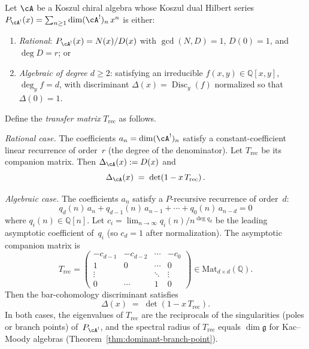 \begin{theorem}\label{thm:discriminant-spectral}
Let $\cA$ be a Koszul chiral algebra whose Koszul dual Hilbert
series $P_{\cA^!}(x) = \sum_{n \geq 1} \dim(\cA^!)_n\, x^n$
is either:
\begin{enumerate}[label=\textup{(\alph*)}]
\item \emph{Rational}: $P_{\cA^!}(x) = N(x)/D(x)$ with
$\gcd(N,D) = 1$, $D(0) = 1$, and $\deg D = r$; or
\item \emph{Algebraic of degree $d \geq 2$}: satisfying an
irreducible $f(x,y) \in \mathbb{Q}[x,y]$, $\deg_y f = d$,
with discriminant $\Delta(x) = \operatorname{Disc}_y(f)$
normalized so that $\Delta(0) = 1$.
\end{enumerate}
Define the \emph{transfer matrix} $T_{\mathrm{rec}}$ as follows.

\emph{Rational case.}
The coefficients $a_n = \dim(\cA^!)_n$ satisfy a
constant-coefficient linear recurrence of order~$r$
(the degree of the denominator).  Let $T_{\mathrm{rec}}$
be its companion matrix.  Then $\Delta_{\cA}(x) := D(x)$ and
\begin{equation}\label{eq:discriminant-spectral-rational}
\Delta_{\cA}(x) \;=\; \det\!\left(1 - x\, T_{\mathrm{rec}}\right).
\end{equation}

\emph{Algebraic case.}
The coefficients $a_n$ satisfy a $P$-recursive recurrence
of order~$d$:
\begin{equation}\label{eq:p-recursive-recurrence}
q_d(n)\, a_n + q_{d-1}(n)\, a_{n-1} + \cdots + q_0(n)\, a_{n-d} = 0
\end{equation}
where $q_i(n) \in \mathbb{Q}[n]$.  Let $c_i = \lim_{n \to \infty}
q_i(n)/n^{\deg q_d}$ be the leading asymptotic coefficient of~$q_i$
\textup{(}so $c_d = 1$ after normalization\textup{)}.
The asymptotic companion matrix is
\[
T_{\mathrm{rec}} =
\begin{pmatrix}
-c_{d-1} & -c_{d-2} & \cdots & -c_0 \\
1 & 0 & \cdots & 0 \\
\vdots & & \ddots & \vdots \\
0 & \cdots & 1 & 0
\end{pmatrix}
\in \mathrm{Mat}_{d \times d}(\mathbb{Q}).
\]
Then the bar-cohomology discriminant satisfies
\begin{equation}\label{eq:discriminant-spectral-general}
\Delta(x) \;=\; \det\!\left(1 - x\, T_{\mathrm{rec}}\right).
\end{equation}
In both cases, the eigenvalues of $T_{\mathrm{rec}}$ are the
reciprocals of the singularities \textup{(}poles or branch
points\textup{)} of~$P_{\cA^!}$, and the spectral
radius of $T_{\mathrm{rec}}$ equals $\dim\mathfrak{g}$ for
Kac--Moody algebras
\textup{(}Theorem~\textup{\ref{thm:dominant-branch-point})}.
\end{theorem}

